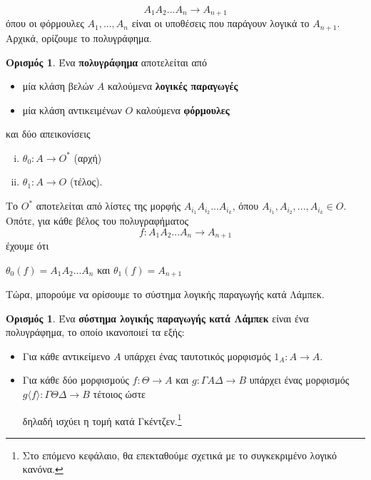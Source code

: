\documentclass [a4paper,11pt] {book}
\theoremstyle{definition}
\theoremstyle{definition}
\newtheorem{definition}[theorem]{Ορισμός}
\begin{document}
\begin{equation*}A_{1}A_{2}...A_{n}\to A_{n+1}
\end{equation*}
όπου οι φόρμουλες $A_{1},...,A_{n}$ είναι οι υποθέσεις που παράγουν λογικά το $A_{n+1}$. Αρχικά, ορίζουμε το πολυγράφημα.
\begin{definition}
Ένα \textbf{πολυγράφημα} αποτελείται από
\begin{itemize}
\item μία κλάση βελών $A$ καλούμενα \textbf{λογικές παραγωγές}
\item μία κλάση αντικειμένων $O$ καλούμενα \textbf{φόρμουλες}
\end{itemize}
και δύο απεικονίσεις
\begin{enumerate}[(i)]
\item $\theta_{0}:A\to O^{*}$ (αρχή)
\item $\theta_{1}:A\to O$ (τέλος).
\end{enumerate}
Το $O^{*}$ αποτελείται από λίστες της μορφής $A_{i_{1}}A_{i_{2}}...A_{i_{k}}$, όπου $A_{i_{1}},A_{i_{2}},...,A_{i_{k}}\in O$. Οπότε, για κάθε βέλος του πολυγραφήματος
\begin{equation*}
f:A_{1}A_{2}...A_{n}\to A_{n+1}
\end{equation*}
έχουμε ότι
\begin{center}
$\theta_{0}(f)=A_{1}A_{2}...A_{n}$ και $\theta_{1}(f)=A_{n+1}$
\end{center}
\end{definition}
Τώρα, μπορούμε να ορίσουμε το σύστημα λογικής παραγωγής κατά Λάμπεκ.
\begin{definition}
Ένα \textbf{σύστημα λογικής παραγωγής κατά Λάμπεκ} είναι ένα πολυγράφημα, το οποίο ικανοποιεί τα εξής:
\begin{itemize}
\item Για κάθε αντικείμενο $A$ υπάρχει ένας ταυτοτικός μορφισμός $1_{A}:A\to A$.
\item Για κάθε δύο μορφισμούς $f:\Theta\to A$ και $g:\Gamma A \Delta\to B$ υπάρχει ένας μορφισμός $g\langle f\rangle :\Gamma\Theta\Delta\to B$ τέτοιος ώστε
\begin{prooftree}
\end{prooftree}
δηλαδή ισχύει η τομή κατά Γκέντζεν.\footnote{Στο επόμενο κεφάλαιο, θα επεκταθούμε σχετικά με το συγκεκριμένο λογικό κανόνα.}
\end{itemize}
\end{definition}
\end{document}
